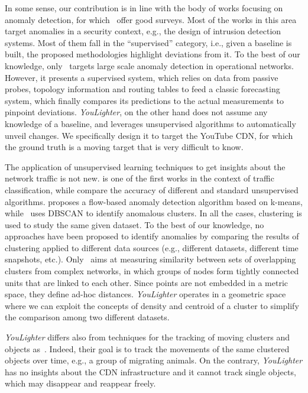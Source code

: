 \documentclass{acm_proc_article-sp}
\newcommand{\tool}{\textit{YouLighter}\xspace}
\begin{document}
In some sense, our contribution is in line with the body of works focusing on anomaly detection, for which~\cite{PatchaCN2007,Chandola2009} offer good surveys. Most of the works in this area target anomalies in a security context, e.g., the design of intrusion detection systems. Most of them fall in the ``supervised'' category, i.e., given a baseline is built, the proposed methodologies highlight deviations from it.
To the best of our knowledge, only~\cite{ArgusInfocom2012} targets large scale anomaly detection in operational networks. However, it presents a supervised system, which relies on data from passive probes, topology information and routing tables to feed a classic forecasting system, which finally compares its predictions to the actual measurements to pinpoint deviations.
\tool, on the other hand does not assume any knowledge of a baseline, and leverages unsupervised algorithms to automatically unveil	 changes. We specifically design it to target the YouTube CDN, for which the ground truth is a moving target that is very difficult to know.

The application of unsupervised learning techniques to get insights about the network traffic is not new. \cite{mcgregor2004flow} is one of the first works in the context of traffic classification, while \cite{erman2006traffic, wang2010automatic} compare the accuracy of different and standard unsupervised algorithms. \cite{munz2007traffic} proposes a flow-based anomaly detection algorithm based on k-means, while~\cite{TorresSigmetrics2009} uses DBSCAN to identify anomalous clusters. In all the cases, clustering is used to study the same given dataset. To the best of our knowledge, no approaches have been proposed to identify anomalies by comparing the results of clustering applied to different data sources (e.g., different datasets, different time snapshots, etc.). Only~\cite{goldberg2010measuring} aims at measuring similarity between sets of overlapping clusters from complex networks, in which groups of nodes form tightly connected
units that are linked to each other. Since points are not embedded in a metric space, they define ad-hoc distances. \tool operates in a geometric space where we can exploit the concepts of density and centroid of a cluster to simplify the comparison among two different datasets.

\tool differs also from techniques for the tracking of moving clusters and objects as~\cite{kalnis2005discovering, li2010swarm}. Indeed, their goal is to track the movements of the same clustered objects over time, e.g., a group of migrating animals. On the contrary, \tool has no insights about the CDN infrastructure and it cannot track single objects, which may disappear and reappear freely. 
\end{document}
